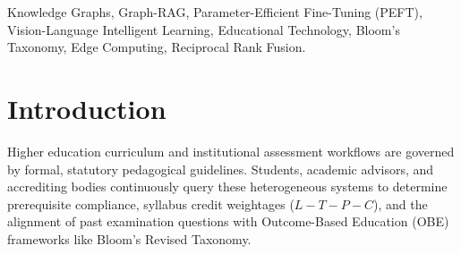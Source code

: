 \documentclass[conference]{IEEEtran}
\begin{document}
\begin{IEEEkeywords}
Knowledge Graphs, Graph-RAG, Parameter-Efficient Fine-Tuning (PEFT), Vision-Language Intelligent Learning, Educational Technology, Bloom's Taxonomy, Edge Computing, Reciprocal Rank Fusion.
\end{IEEEkeywords}

\section{Introduction}
Higher education curriculum and institutional assessment workflows are governed by formal, statutory pedagogical guidelines. Students, academic advisors, and accrediting bodies continuously query these heterogeneous systems to determine prerequisite compliance, syllabus credit weightages ($L-T-P-C$), and the alignment of past examination questions with Outcome-Based Education (OBE) frameworks like Bloom's Revised Taxonomy.
\end{document}
